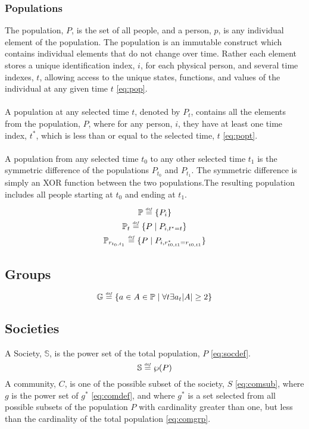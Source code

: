 \documentclass[]{article}
\newcommand{\defeq}{\stackrel{\smash{\scriptscriptstyle\mathit{def}}}{=}}
\begin{document}
\subsubsection*{Populations}
The population, $P$, is the set of all people, and a person, $p$, is any individual element of the population. The population is an immutable construct which contains individual elements that do not change over time. Rather each element stores a unique identification index, $i$, for each physical person, and several time indexes, $t$, allowing access to the unique states, functions, and values of the individual at any given time $t$ \eqref{eq:pop}.
\\
\\
A population at any selected time $t$, denoted by $P_{t}$, contains all the elements from the population, $P$, where for any person, $i$, they have at least one time index, $t^{*}$, which is less than or equal to the selected time, $t$ \eqref{eq:popt}.  
\\
\\
A population from any selected time $t_{0}$ to any other selected time $t_{1}$ is the symmetric difference of the populations $P_{t_{0}}$ and $P_{t_{1}}$. The symmetric difference is simply an XOR function between the two populations.The resulting population includes all people starting at $t_{0}$ and ending at $t_{1}$.
% 

\begin{equation} \label{eq:population} 
\mathbb{P} \defeq \{ P_{i} \} 
\end{equation}
\begin{equation} \label{eq:population_time} 
\mathbb{P}_{t} \defeq \{ P \mid P_{i,t^{*}=t} \} 
\end{equation}
\begin{equation} \label{eq:population_range} 
\mathbb{P}_{r_{t_{0},t_{1}}} \defeq \{ P \mid P_{i,r^{*}_{t0,t1}=r^{ }_{t0,t1}} \} 
\end{equation}
%
\subsection*{Groups}
\begin{equation} \label{eq:comgrp} \mathbb{G} \defeq \{ a \in A \in \mathbb{P} \mid \forall t\exists a_{t}|A| \geq 2 \} \end{equation}
\subsection*{Societies}
%
A Society, $\mathbb{S}$, is the power set of the total population, $P$ \eqref{eq:socdef}.
\begin{equation} \label{eq:socdef} \mathbb{S} \defeq \wp(P) \end{equation}
%
A community, $C$, is one of the possible subset of the society, $S$ \eqref{eq:comsub}, where $g$ is the power set of $g^{*}$ \eqref{eq:comdef}, and where $g^{*}$ is a set selected from all possible subsets of the population $P$ with cardinality greater than one, but less than the cardinality of the total population \eqref{eq:comgrp}.
 
\end{document}
